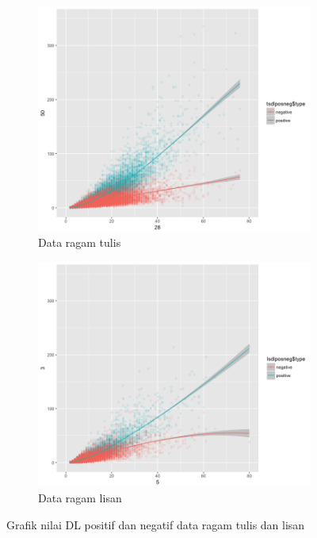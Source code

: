 \begin{figure}
\centering

\begin{subfigure}{.8\linewidth}
  \centering
  \includegraphics[width=1\linewidth] {pics/tulis_DLposneg.png} 
	\caption{Data ragam tulis}
	\label{fig:tulis_DLposneg} 
\end{subfigure}
%
\begin{subfigure}{.8\linewidth}
  \centering
  \includegraphics[width=1\linewidth]{pics/lisan_DLposneg.png} 
	\caption{Data ragam lisan}
	\label{fig:lisan_DLposneg} 
\end{subfigure}

\caption{Grafik nilai DL positif dan negatif data ragam tulis dan lisan}
\label{fig:DL_posneg}
\end{figure}


